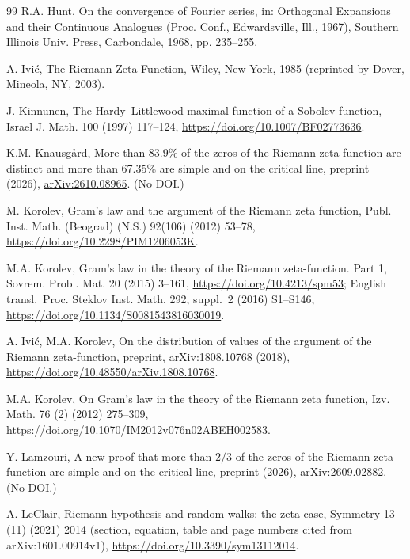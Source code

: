 \documentclass[preprint,12pt]{elsarticle}
\numberwithin{equation}{section}
\theoremstyle{plain}
\theoremstyle{definition}
\theoremstyle{remark}
\begin{document}
\begin{thebibliography}{99}
R.A. Hunt, On the convergence of Fourier series, in: Orthogonal Expansions and their Continuous Analogues (Proc. Conf., Edwardsville, Ill., 1967), Southern Illinois Univ. Press, Carbondale, 1968, pp. 235--255.

A. Ivi\'c, The Riemann Zeta-Function, Wiley, New York, 1985 (reprinted by Dover, Mineola, NY, 2003).

J. Kinnunen, The Hardy--Littlewood maximal function of a Sobolev function, Israel J. Math. 100 (1997) 117--124, \href{https://doi.org/10.1007/BF02773636}{https://doi.org/10.1007/BF02773636}.

K.M. Knausg\aa rd, More than 83.9\% of the zeros of the Riemann zeta function are distinct and more than 67.35\% are simple and on the critical line, preprint (2026), \href{https://arxiv.org/abs/2610.08965}{arXiv:2610.08965}. (No DOI.)

M. Korolev, Gram's law and the argument of the Riemann zeta function, Publ. Inst. Math. (Beograd) (N.S.) 92(106) (2012) 53--78, \href{https://doi.org/10.2298/PIM1206053K}{https://doi.org/10.2298/PIM1206053K}.

M.A. Korolev, Gram\textquoteright s law in the theory of the Riemann zeta-function. Part 1, Sovrem. Probl. Mat. 20 (2015) 3--161, \href{https://doi.org/10.4213/spm53}{https://doi.org/10.4213/spm53}; English transl.\ Proc. Steklov Inst. Math. 292, suppl.~2 (2016) S1--S146, \href{https://doi.org/10.1134/S0081543816030019}{https://doi.org/10.1134/S0081543816030019}.

A. Ivi\'c, M.A. Korolev, On the distribution of values of the argument of the Riemann zeta-function, preprint, arXiv:1808.10768 (2018), \href{https://doi.org/10.48550/arXiv.1808.10768}{https://doi.org/10.48550/arXiv.1808.10768}.

M.A. Korolev, On Gram's law in the theory of the Riemann zeta function, Izv. Math. 76 (2) (2012) 275--309, \href{https://doi.org/10.1070/IM2012v076n02ABEH002583}{https://doi.org/10.1070/IM2012v076n02ABEH002583}.


Y. Lamzouri, A new proof that more than $2/3$ of the zeros of the Riemann zeta function are simple and on the critical line, preprint (2026), \href{https://arxiv.org/abs/2609.02882}{arXiv:2609.02882}. (No DOI.)

A. LeClair, Riemann hypothesis and random walks: the zeta case, Symmetry 13 (11) (2021) 2014 (section, equation, table and page numbers cited from arXiv:1601.00914v1), \href{https://doi.org/10.3390/sym13112014}{https://doi.org/10.3390/sym13112014}.


\end{thebibliography}
\end{document}
